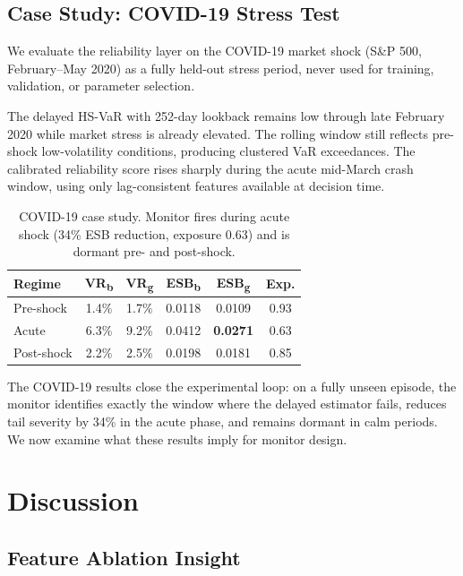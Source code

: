 \documentclass[sigconf, anonymous]{acmart}
\begin{document}
\subsection{Case Study: COVID-19 Stress Test}

We evaluate the reliability layer on the COVID-19 market shock (S\&P 500, February--May 2020) as a fully held-out stress period, never used for training, validation, or parameter selection.

The delayed HS-VaR with 252-day lookback remains low through late February 2020 while market stress is already elevated. The rolling window still reflects pre-shock low-volatility conditions, producing clustered VaR exceedances. The calibrated reliability score rises sharply during the acute mid-March crash window, using only lag-consistent features available at decision time.


\begin{table}[t]
\caption{COVID-19 case study. Monitor fires during acute shock (34\%
ESB reduction, exposure 0.63) and is dormant pre- and post-shock.}
\label{tab:covid}
\small
\begin{tabular}{lccccc}
\toprule
\textbf{Regime} & \textbf{VR\textsubscript{b}} & \textbf{VR\textsubscript{g}} & \textbf{ESB\textsubscript{b}} & \textbf{ESB\textsubscript{g}} & \textbf{Exp.} \\
\midrule
Pre-shock  & 1.4\% & 1.7\% & 0.0118 & 0.0109 & 0.93 \\
Acute      & 6.3\% & 9.2\% & 0.0412 & \textbf{0.0271} & 0.63 \\
Post-shock & 2.2\% & 2.5\% & 0.0198 & 0.0181 & 0.85 \\
\bottomrule
\end{tabular}
\end{table}



The COVID-19 results close the experimental loop: on a fully unseen
episode, the monitor identifies exactly the window where the delayed
estimator fails, reduces tail severity by 34\% in the acute phase,
and remains dormant in calm periods. We now examine what these results
imply for monitor design.

\section{Discussion}
\label{sec:discussion}

\subsection{Feature Ablation Insight}
\end{document}
